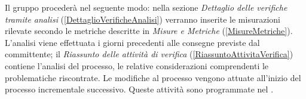 	Il gruppo procederà nel seguente modo: nella sezione \emph{Dettaglio delle verifiche tramite analisi} (\ref{DettaglioVerificheAnalisi}) verranno inserite le misurazioni rilevate secondo le metriche descritte in \emph{Misure e Metriche} (\ref{MisureMetriche}). L'analisi viene effettuata i giorni precedenti alle consegne previste dal committente; il \emph{Riassunto delle attività di verifica} (\ref{RiassuntoAttivitaVerifica}) contiene l'analisi del processo, le relative considerazioni  comprendenti le problematiche riscontrate.
	Le modifiche al processo vengono attuate all'inizio del processo incrementale successivo. Queste attività sono programmate nel \PianoDiProgetto.
	
